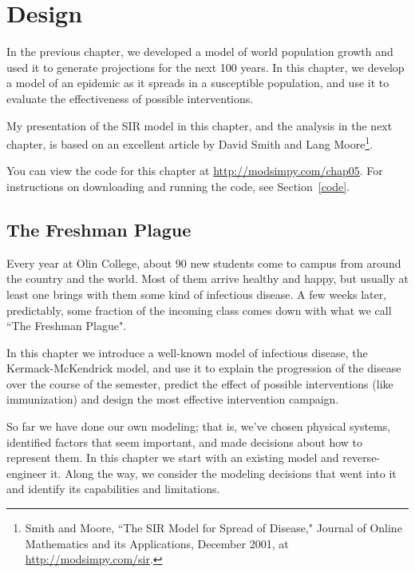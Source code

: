 \documentclass[12pt]{book}
\theoremstyle{exercise}
\begin{document}
\chapter{Design}

In the previous chapter, we developed a model of world population growth and used it to generate projections for the next 100 years.  In this chapter, we develop a model of an epidemic as it spreads in a susceptible population, and use it to evaluate the effectiveness of possible interventions.

My presentation of the SIR model in this chapter, and the analysis in the next chapter, is based on an excellent article by David Smith and Lang Moore\footnote{Smith and Moore, ``The SIR Model for Spread of Disease," Journal of Online Mathematics and its Applications, December 2001, at \url{http://modsimpy.com/sir}.}.

You can view the code for this chapter at \url{http://modsimpy.com/chap05}.  For instructions on downloading and running the code, see Section~\ref{code}.


\section{The Freshman Plague}

Every year at Olin College, about 90 new students come to campus from around the country and the world.  Most of them arrive healthy and happy, but usually at least one brings with them some kind of infectious disease.  A few weeks later, predictably, some fraction of the incoming class comes down with what we call ``The Freshman Plague".

In this chapter we introduce a well-known model of infectious disease, the Kermack-McKendrick model, and use it to explain the progression of the disease over the course of the semester, predict the effect of possible interventions (like immunization) and design the most effective intervention campaign.

So far we have done our own modeling; that is, we've chosen physical systems, identified factors that seem important, and made decisions about how to represent them.  In this chapter we start with an existing model and reverse-engineer it.  Along the way, we consider the modeling decisions that went into it and identify its capabilities and limitations.
\end{document}
